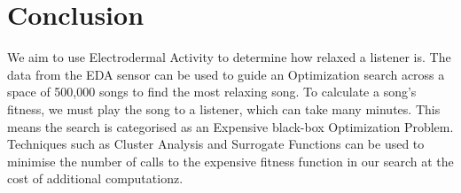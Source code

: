 \documentclass{article}
\begin{document}
	\section{Conclusion}
	We aim to use Electrodermal Activity to determine how relaxed a listener is. The data from the EDA sensor can be used to guide an Optimization search across a space of 500,000 songs to find the most relaxing song. To calculate a song's fitness, we must play the song to a listener, which can take many minutes. This means the search is categorised as an Expensive black-box Optimization Problem. Techniques such as Cluster Analysis and Surrogate Functions can be used to minimise the number of calls to the expensive fitness function in our search at the cost of additional computationz.
	
	\newpage
	\begin{footnotesize}
		\begin{multicols}{2}
			
		\end{multicols}
	\end{footnotesize}
	\restoregeometry
	
\end{document}
